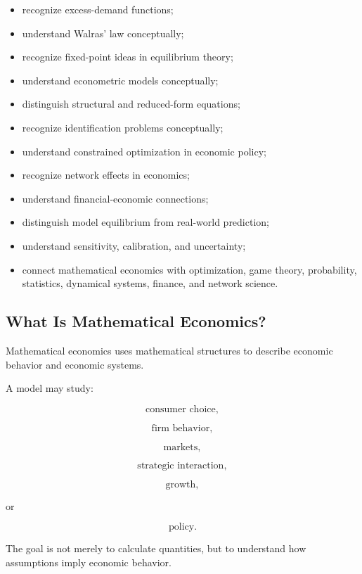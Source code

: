 {\begin{itemize}
    \item recognize excess-demand functions;
    \item understand Walras' law conceptually;
    \item recognize fixed-point ideas in equilibrium theory;
    \item understand econometric models conceptually;
    \item distinguish structural and reduced-form equations;
    \item recognize identification problems conceptually;
    \item understand constrained optimization in economic policy;
    \item recognize network effects in economics;
    \item understand financial-economic connections;
    \item distinguish model equilibrium from real-world prediction;
    \item understand sensitivity, calibration, and uncertainty;
    \item connect mathematical economics with optimization, game theory,
          probability, statistics, dynamical systems, finance,
          and network science.
\end{itemize}
}

\subsection{What Is Mathematical Economics?}
\label{subsec:what-is-mathematical-economics}

Mathematical economics uses mathematical structures to describe economic
behavior and economic systems.

A model may study:

\[
\boxed{
\text{consumer choice},
}
\]

\[
\boxed{
\text{firm behavior},
}
\]

\[
\boxed{
\text{markets},
}
\]

\[
\boxed{
\text{strategic interaction},
}
\]

\[
\boxed{
\text{growth},
}
\]

or

\[
\boxed{
\text{policy}.
}
\]

The goal is not merely to calculate quantities, but to understand how
assumptions imply economic behavior.

